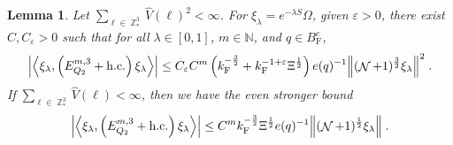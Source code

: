 \documentclass[12pt,a4paper]{article}
\numberwithin{equation}{section}
\newcommand{\NNN}{\mathbb{N}}
\newcommand{\1}{\mathbb{I}}
\newcommand{\F}{\mathrm{F}}
\DeclareMathOperator{\Z}{\mathbb{Z}}
\DeclareMathOperator{\NN}{\mathcal{N}}
\newcommand{\half}{\frac{1}{2}}
\newcommand{\eva}[1]{\left\langle #1 \right\rangle}
\theoremstyle{plain}
\newtheorem{lemma}[theorem]{Lemma}
\theoremstyle{definition}
\theoremstyle{remark}
\theoremstyle{plain}
\theoremstyle{definition}
\theoremstyle{remark}
\begin{document}
\begin{lemma} \label{lem:EQ215}
Let $ \sum_{\ell \in \Z^3_*} \hat{V}(\ell)^2 < \infty $. For $\xi_\lambda = e^{-\lambda S} \Omega$, given $ \varepsilon > 0 $, there exist $ C, C_\varepsilon > 0 $ such that for all $ \lambda \in [0,1] $, $ m \in \NNN $, and $ q \in B_{\F}^c $,
\begin{equation} \label{eq:estEQ215_Coulomb}
\begin{aligned}
	\abs{\eva{\xi_\lambda,\left(E^{m,3}_{Q_2}+\mathrm{h.c.}\right) \xi_\lambda }}\nonumber
	\leq C_\varepsilon C^m \left( k_{\F}^{-\frac 32}
		+ k_{\F}^{-1 + \varepsilon} \Xi^\half \right)
		e(q)^{-1}
		\norm{(\NN+1)^{\frac 32} \xi_\lambda }^2 \;.
\end{aligned}
\end{equation}
If $ \sum_{\ell \in \Z^3_*} \hat{V}(\ell) < \infty $, then we have the even stronger bound
\begin{equation} \label{eq:estEQ215}
\begin{aligned}
	\abs{\eva{\xi_\lambda,\left(E^{m,3}_{Q_2}+\mathrm{h.c.}\right) \xi_\lambda }}\nonumber
	\leq C^m k_{\F}^{-\frac{3}{2}} \Xi^{\half} e(q)^{-1}
		\norm{(\NN+1)^\half \xi_\lambda } \;.
\end{aligned}
\end{equation}
\end{lemma}
\end{document}
